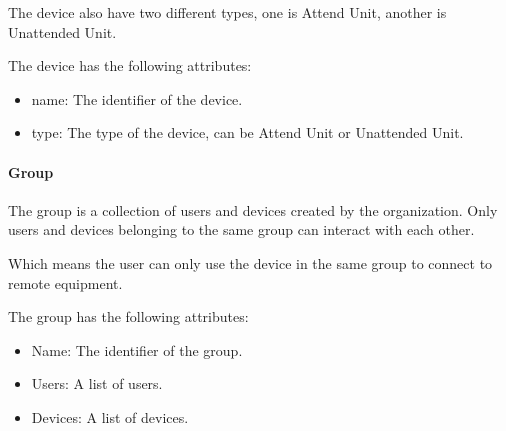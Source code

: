The device also have two different types, one is Attend Unit, another is
Unattended Unit.

The device has the following attributes:
\begin{itemize}
    \item name: The identifier of the device.
    \item type: The type of the device, can be Attend Unit or Unattended Unit.
\end{itemize}
    
\paragraph{Group}
The group is a collection of users and devices created by the organization.
Only users and devices belonging to the same group can interact with each other.

Which means the user can only use the device in the same group to connect to remote equipment.

The group has the following attributes:
\begin{itemize}
    \item Name: The identifier of the group.
    \item Users: A list of users.
    \item Devices: A list of devices.
\end{itemize}
